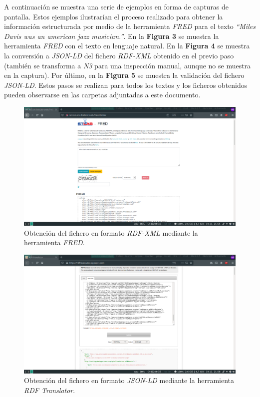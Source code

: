 \documentclass[11pt]{article}
\begin{document}
A continuación se muestra una serie de ejemplos en forma de capturas de pantalla. Estos ejemplos ilustrarían el proceso realizado para obtener la información estructurada por medio de la herramienta \textit{FRED} para el texto \textit{“Miles Davis was an american jazz musician.”}. En la \textbf{Figura 3} se muestra la herramienta \textit{FRED} con el texto en lenguaje natural. En la \textbf{Figura 4} se muestra la conversión a \textit{JSON-LD} del fichero \textit{RDF-XML} obtenido en el previo paso (también se transforma a \textit{N3} para una inspección manual, aunque no se muestra en la captura). Por último, en la \textbf{Figura 5} se muestra la validación del fichero \textit{JSON-LD}. Estos pasos se realizan para todos los textos y los ficheros obtenidos pueden observarse en las carpetas adjuntadas a este documento.

\begin{figure}[h]
\caption{Obtención del fichero en formato \textit{RDF-XML} mediante la herramienta \textit{FRED}.}
\centering
\includegraphics[width=\textwidth]{fred_1}
\end{figure}

\begin{figure}[h]
\caption{Obtención del fichero en formato \textit{JSON-LD} mediante la herramienta \textit{RDF Translator}.}
\centering
\includegraphics[width=\textwidth]{fred_2}
\end{figure}
\end{document}
